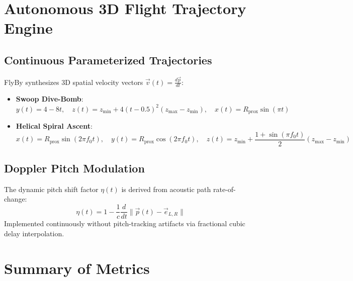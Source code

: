 \documentclass[11pt,a4paper]{article}
\begin{document}
\section{Autonomous 3D Flight Trajectory Engine}

\subsection{Continuous Parameterized Trajectories}
FlyBy synthesizes 3D spatial velocity vectors $\vec{v}(t) = \frac{d\vec{p}}{dt}$:
\begin{itemize}
    \item \textbf{Swoop Dive-Bomb}:
    \begin{equation}
    y(t) = 4 - 8t, \quad z(t) = z_{\text{min}} + 4(t - 0.5)^2 (z_{\text{max}} - z_{\text{min}}), \quad x(t) = R_{\text{prox}} \sin(\pi t)
    \end{equation}
    \item \textbf{Helical Spiral Ascent}:
    \begin{equation}
    x(t) = R_{\text{prox}} \sin(2\pi f_0 t), \quad y(t) = R_{\text{prox}} \cos(2\pi f_0 t), \quad z(t) = z_{\text{min}} + \frac{1 + \sin(\pi f_0 t)}{2}(z_{\text{max}} - z_{\text{min}})
    \end{equation}
\end{itemize}

\subsection{Doppler Pitch Modulation}
The dynamic pitch shift factor $\eta(t)$ is derived from acoustic path rate-of-change:
\begin{equation}
\eta(t) = 1 - \frac{1}{c} \frac{d}{dt} \|\vec{p}(t) - \vec{e}_{L,R}\|
\end{equation}
Implemented continuously without pitch-tracking artifacts via fractional cubic delay interpolation.

\section{Summary of Metrics}
\end{document}
